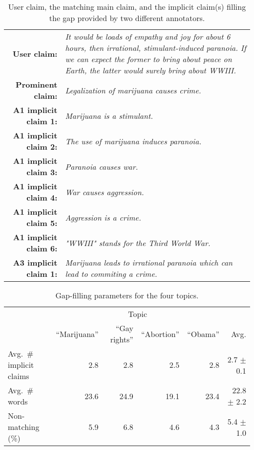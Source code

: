 \begin{table}[t!]
{\small
\begin{tabular}{@{\ }r@{\ \  }p{}}
\toprule
\textbf{User claim:} & \emph{It would be loads of empathy and joy for about 6
hours, then irrational, stimulant-induced paranoia. If we can expect the former
to bring about peace on Earth, the latter would surely bring about WWIII.}\\
\textbf{Prominent claim:} & \emph{Legalization of marijuana causes crime.}\\
\midrule
\textbf{A1 implicit claim 1:} & \emph{Marijuana is a stimulant.}\\
\textbf{A1 implicit claim 2:} & \emph{The use of marijuana induces paranoia.}\\
\textbf{A1 implicit claim 3:} & \emph{Paranoia causes war.}\\
\textbf{A1 implicit claim 4:} & \emph{War causes aggression.}\\
\textbf{A1 implicit claim 5:} & \emph{Aggression is a crime.}\\
\textbf{A1 implicit claim 6:} & \emph{"WWIII" stands for the Third World War.}\\
\midrule
\textbf{A3 implicit claim 1:} & \emph{Marijuana leads to irrational paranoia which can lead to commiting a crime.} \\
\bottomrule
\end{tabular}}
\caption{User claim, the matching main claim, and the implicit claim(s)
filling the gap provided by two different annotators.}
\label{tab:extreme_premisenumber}
\end{table}

\begin{table}
{\small
\begin{center}
\setlength{\tabcolsep}{4.2pt}
\begin{tabular}{@{}lrrrrr@{}}
\toprule
&\multicolumn{4}{c}{Topic}\\
\cmidrule(lr){2-5}
& ``Marijuana'' & ``Gay rights'' & ``Abortion'' & ``Obama'' & Avg. \\
\midrule
Avg.~\#\,implicit claims  & 2.8  & 2.8   & 2.5   &  2.8  &  \phantom{0}2.7 $\pm$ 0.1 \\
Avg.~\#\,words     & 23.6  & 24.9   & 19.1   &  23.4  & 22.8 $\pm$ 2.2\\
Non-matching (\%)     & 5.9  & 6.8   & 4.6   &  4.3  &  \phantom{0}5.4 $\pm$ 1.0\\
\bottomrule
\end{tabular}
\caption{Gap-filling parameters for the four topics.}
\label{tab:var-topics}
\end{center}}
\end{table}

